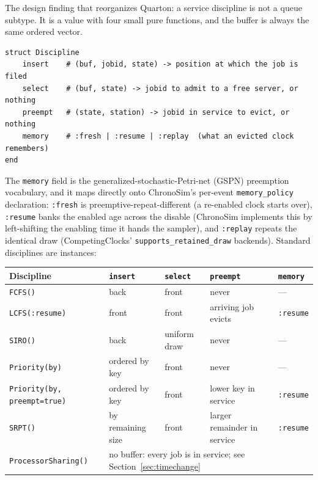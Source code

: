 \documentclass[11pt]{article}
\newcommand{\code}[1]{\texttt{#1}}
\begin{document}
The design finding that reorganizes Quarton: a service discipline is not a
queue subtype. It is a value with four small pure functions, and the buffer is
always the same ordered vector.

\begin{lstlisting}
struct Discipline
    insert    # (buf, jobid, state) -> position at which the job is filed
    select    # (buf, state) -> jobid to admit to a free server, or nothing
    preempt   # (state, station) -> jobid in service to evict, or nothing
    memory    # :fresh | :resume | :replay  (what an evicted clock remembers)
end
\end{lstlisting}

The \code{memory} field is the generalized-stochastic-Petri-net (GSPN)
preemption vocabulary, and it maps directly onto ChronoSim's per-event
\code{memory\_policy} declaration: \code{:fresh} is preemptive-repeat-different
(a re-enabled clock starts over), \code{:resume} banks the enabled age across
the disable (ChronoSim implements this by left-shifting the enabling time it
hands the sampler), and \code{:replay} repeats the identical draw
(CompetingClocks' \code{supports\_retained\_draw} backends). Standard
disciplines are instances:

\begin{center}
\small
\begin{tabular}{@{}lllll@{}}
\toprule
Discipline & \code{insert} & \code{select} & \code{preempt} & \code{memory} \\
\midrule
\code{FCFS()}            & back           & front   & never & --- \\
\code{LCFS(:resume)}     & front          & front   & arriving job evicts & \code{:resume} \\
\code{SIRO()}            & back           & uniform draw & never & --- \\
\code{Priority(by)}      & ordered by key & front   & never & --- \\
\code{Priority(by, preempt=true)} & ordered by key & front & lower key in service & \code{:resume} \\
\code{SRPT()}            & by remaining size & front & larger remainder in service & \code{:resume} \\
\code{ProcessorSharing()} & \multicolumn{4}{l}{no buffer: every job is in service; see Section~\ref{sec:timechange}} \\
\bottomrule
\end{tabular}
\end{center}
\end{document}
